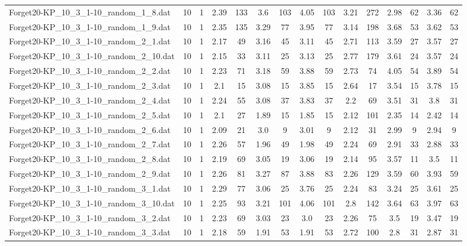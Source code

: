\begin{table}[!ht]
{\begin{tabular}{lcccccccccccccc}
Forget20-KP\_10\_3\_1-10\_random\_1\_8.dat & 10 & 1 & 2.39 & 133 & 3.6 & 103 & 4.05 & 103 & 3.21 & 272 & 2.98 & 62 & 3.36 & 62 \\
Forget20-KP\_10\_3\_1-10\_random\_1\_9.dat & 10 & 1 & 2.35 & 135 & 3.29 & 77 & 3.95 & 77 & 3.14 & 198 & 3.68 & 53 & 3.62 & 53 \\
Forget20-KP\_10\_3\_1-10\_random\_2\_1.dat & 10 & 1 & 2.17 & 49 & 3.16 & 45 & 3.11 & 45 & 2.71 & 113 & 3.59 & 27 & 3.57 & 27 \\
Forget20-KP\_10\_3\_1-10\_random\_2\_10.dat & 10 & 1 & 2.15 & 33 & 3.11 & 25 & 3.13 & 25 & 2.77 & 179 & 3.61 & 24 & 3.57 & 24 \\
Forget20-KP\_10\_3\_1-10\_random\_2\_2.dat & 10 & 1 & 2.23 & 71 & 3.18 & 59 & 3.88 & 59 & 2.73 & 74 & 4.05 & 54 & 3.89 & 54 \\
Forget20-KP\_10\_3\_1-10\_random\_2\_3.dat & 10 & 1 & 2.1 & 15 & 3.08 & 15 & 3.85 & 15 & 2.64 & 17 & 3.54 & 15 & 3.78 & 15 \\
Forget20-KP\_10\_3\_1-10\_random\_2\_4.dat & 10 & 1 & 2.24 & 55 & 3.08 & 37 & 3.83 & 37 & 2.2 & 69 & 3.51 & 31 & 3.8 & 31 \\
Forget20-KP\_10\_3\_1-10\_random\_2\_5.dat & 10 & 1 & 2.1 & 27 & 1.89 & 15 & 1.85 & 15 & 2.12 & 101 & 2.35 & 14 & 2.42 & 14 \\
Forget20-KP\_10\_3\_1-10\_random\_2\_6.dat & 10 & 1 & 2.09 & 21 & 3.0 & 9 & 3.01 & 9 & 2.12 & 31 & 2.99 & 9 & 2.94 & 9 \\
Forget20-KP\_10\_3\_1-10\_random\_2\_7.dat & 10 & 1 & 2.26 & 57 & 1.96 & 49 & 1.98 & 49 & 2.24 & 69 & 2.91 & 33 & 2.88 & 33 \\
Forget20-KP\_10\_3\_1-10\_random\_2\_8.dat & 10 & 1 & 2.19 & 69 & 3.05 & 19 & 3.06 & 19 & 2.14 & 95 & 3.57 & 11 & 3.5 & 11 \\
Forget20-KP\_10\_3\_1-10\_random\_2\_9.dat & 10 & 1 & 2.26 & 81 & 3.27 & 87 & 3.88 & 83 & 2.26 & 129 & 3.59 & 60 & 3.93 & 59 \\
Forget20-KP\_10\_3\_1-10\_random\_3\_1.dat & 10 & 1 & 2.29 & 77 & 3.06 & 25 & 3.76 & 25 & 2.24 & 83 & 3.24 & 25 & 3.61 & 25 \\
Forget20-KP\_10\_3\_1-10\_random\_3\_10.dat & 10 & 1 & 2.25 & 93 & 3.21 & 101 & 4.06 & 101 & 2.8 & 142 & 3.64 & 63 & 3.97 & 63 \\
Forget20-KP\_10\_3\_1-10\_random\_3\_2.dat & 10 & 1 & 2.23 & 69 & 3.03 & 23 & 3.0 & 23 & 2.26 & 75 & 3.5 & 19 & 3.47 & 19 \\
Forget20-KP\_10\_3\_1-10\_random\_3\_3.dat & 10 & 1 & 2.18 & 59 & 1.91 & 53 & 1.91 & 53 & 2.72 & 100 & 2.8 & 31 & 2.87 & 31 \\

\end{tabular}}
\end{table}
